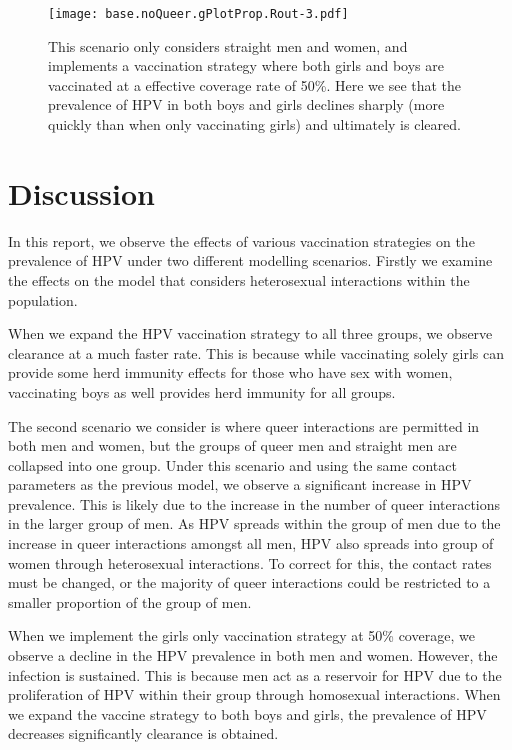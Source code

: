 \documentclass[12pt]{article}
\begin{document}
\begin{figure}[h!]
\begin{center}
\texttt{[image: base.noQueer.gPlotProp.Rout-3.pdf]}
\caption{This scenario only considers straight men and women, and implements a vaccination strategy where both girls and boys are vaccinated at a effective coverage rate of 50\%.  Here we see that the prevalence of HPV in both boys and girls declines sharply (more quickly than when only vaccinating girls) and ultimately is cleared.}
\label{fig:noQueerAllVacc50}
\end{center}
\end{figure}





\section{Discussion}

In this report, we observe the effects of various vaccination strategies on the prevalence of HPV under two different modelling scenarios.  Firstly we examine the effects on the model that considers heterosexual interactions within the population.  

 
When we expand the HPV vaccination strategy to all three groups, we observe clearance at a much faster rate.  This is because while vaccinating solely girls can provide some herd immunity effects for those who have sex with women, vaccinating boys as well provides herd immunity for all groups.  

The second scenario we consider is where queer interactions are permitted in both men and women, but the groups of queer men and straight men are collapsed into one group.  Under this scenario and using the same contact parameters as the previous model, we observe a significant increase in HPV prevalence.  This is likely due to the increase in the number of queer interactions in the larger group of men.  As HPV spreads within the group of men due to the increase in queer interactions amongst all men, HPV also spreads into group of women through heterosexual interactions.  To correct for this, the contact rates must be changed, or the majority of queer interactions could be restricted to a smaller proportion of the group of men. 

When we implement the girls only vaccination strategy at 50\% coverage, we observe a decline in the HPV prevalence in both men and women.  However, the infection is sustained.  This is because men act as a reservoir for HPV due to the proliferation of HPV within their group through homosexual interactions.  When we expand the vaccine strategy to both boys and girls, the prevalence of HPV decreases significantly clearance is obtained. 
\end{document}
